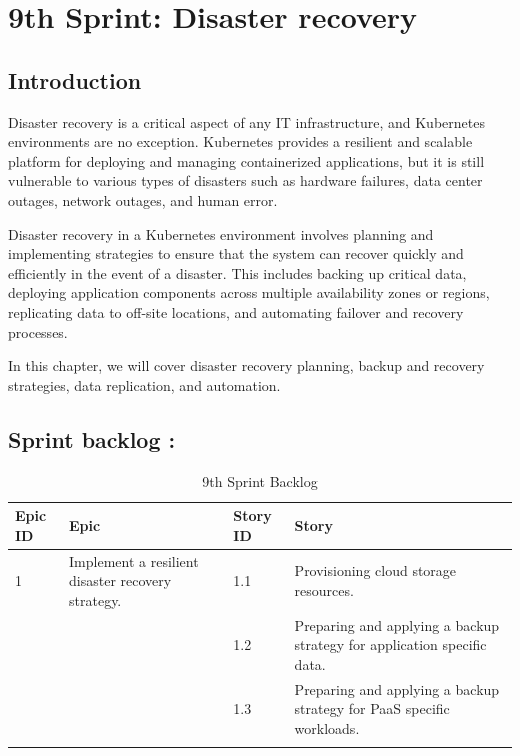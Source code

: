 \graphicspath{{./assets/}}
\setcounter{mtc}{11}
\chapter{9th Sprint: Disaster recovery }

\minitoc
\newpage
\section*{Introduction}
Disaster recovery is a critical aspect of any IT infrastructure, and Kubernetes environments are no exception. Kubernetes provides a resilient and scalable platform for deploying and managing containerized applications, but it is still vulnerable to various types of disasters such as hardware failures, data center outages, network outages, and human error. 

Disaster recovery in a Kubernetes environment involves planning and implementing strategies to ensure that the system can recover quickly and efficiently in the event of a disaster. This includes backing up critical data, deploying application components across multiple availability zones or regions, replicating data to off-site locations, and automating failover and recovery processes. 

In this chapter, we will cover disaster recovery planning, backup and recovery strategies, data replication, and automation.  


\section{Sprint backlog :}

\begin{longtable}[H]{|m{1.5cm}|m{3cm}|m{1.5cm}|m{9cm}|}
\hline
{\textbf{Epic ID}} & {\textbf{Epic}} & {\textbf{Story ID}} & {\textbf{Story}}\\
\hline
1  & Implement a resilient disaster recovery strategy.  &  1.1	 & Provisioning cloud storage resources. \\
\cline{3-4}
& & 1.2 & Preparing and applying a backup strategy for application specific data.  \\
\cline{3-4}
& & 1.3	& Preparing and applying a backup strategy for PaaS specific workloads.   \\
\cline{3-4}
\hline
\caption{9th Sprint Backlog}
\end{longtable}

